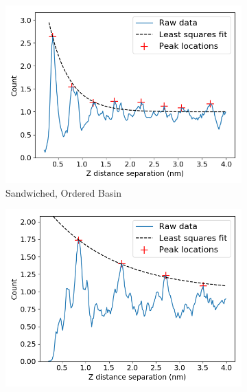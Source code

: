 \documentclass[journal=jpcbfk,manusciprt=article]{achemso}
\begin{document}
  
  \begin{figure}[!htb]
  \centering
  \begin{subfigure}{0.45\textwidth}
  \centering
  \includegraphics[width=\textwidth]{z_correlation_sandwich.png}
  \caption{Sandwiched, Ordered Basin}\label{fig:z_correlation_sandwich}
  \end{subfigure}  
  \begin{subfigure}{0.45\textwidth}
  \centering
  \includegraphics[width=\textwidth]{z_correlation_offset.png}

\end{subfigure}
\end{figure}
\end{document}
